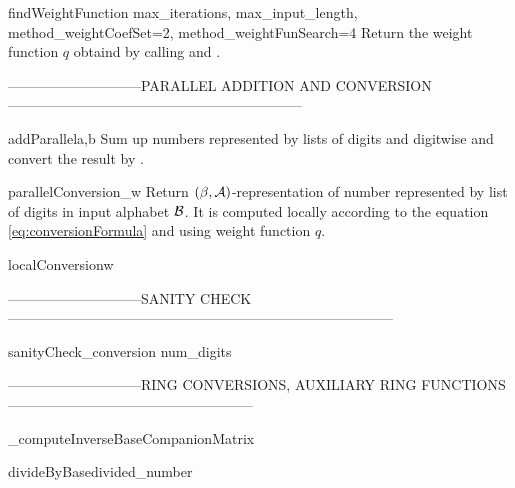 \begin{method}{findWeightFunction}{ max\_iterations, max\_input\_length, method\_weightCoefSet=2, method\_weightFunSearch=4}
Return the weight function $q$ obtaind by calling  and .
\end{method}


-----------------------------PARALLEL ADDITION AND CONVERSION---------------------------------------------------------------

\begin{method}{addParallel}{a,b}
Sum up numbers represented by lists of digits  and  digitwise and convert the result by . 
\end{method}


\begin{method}{parallelConversion}{\_w}
Return $(\beta,\mathcal{A})$-representation of number represented by list  of digits in input alphabet $\mathcal{B}$. It is computed locally according to the equation \ref{eq:conversionFormula} and using weight function $q$.
\end{method}


\begin{method}{localConversion}{w}

\end{method}


-----------------------------SANITY CHECK-----------------------------------------------------------------------------------

\begin{method}{sanityCheck\_conversion}{ num\_digits}

\end{method}


-----------------------------RING CONVERSIONS, AUXILIARY RING FUNCTIONS-----------------------------------------------------

\begin{method}{\_computeInverseBaseCompanionMatrix}{}

\end{method}


\begin{method}{divideByBase}{divided\_number}

\end{method}

